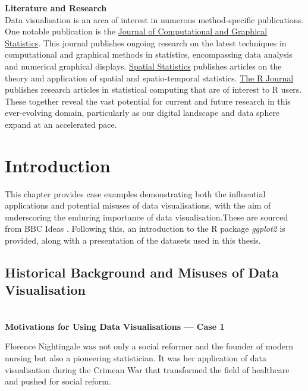 \documentclass{article}\usepackage[]{graphicx}\usepackage[]{xcolor}
\numberwithin{equation}{section}
\begin{document}
\noindent \textbf{Literature and Research}\\ %
\noindent
Data visualisation is an area of interest in numerous method-specific publications. One notable publication is the \href{https://www.tandfonline.com/journals/ucgs20}{Journal of Computational and Graphical Statistics}. This journal publishes ongoing research on the latest techniques in computational and graphical methods in statistics, encompassing data analysis and numerical graphical displays. \href{https://www.sciencedirect.com/journal/spatial-statistics}{Spatial Statistics} publishes articles on the theory and application of spatial and spatio-temporal statistics. \href{https://journal.r-project.org}{The R Journal} publishes research articles in statistical computing that are of interest to R users. These together reveal the vast potential for current and future research in this ever-evolving domain, particularly as our digital landscape and data sphere expand at an accelerated pace.\\

\newpage 

\section{Introduction}

\noindent
This chapter provides case examples demonstrating both the influential applications and potential misuses of data visualisations, with the aim of underscoring the enduring importance of data visualisation.These are sourced from BBC Ideas \cite{bbcdatavis}. Following this, an introduction to the R package \textit{ggplot2} is provided, along with a presentation of the datasets used in this thesis.

\subsection{Historical Background and Misuses of Data Visualisation}
 
\\\textbf{Motivations for Using Data Visualisations — Case 1}

\noindent
Florence Nightingale was not only a social reformer and the founder of modern nursing but also a pioneering statistician. It was her application of data visualisation during the Crimean War that transformed the field of healthcare and pushed for social reform.\\  
\end{document}
